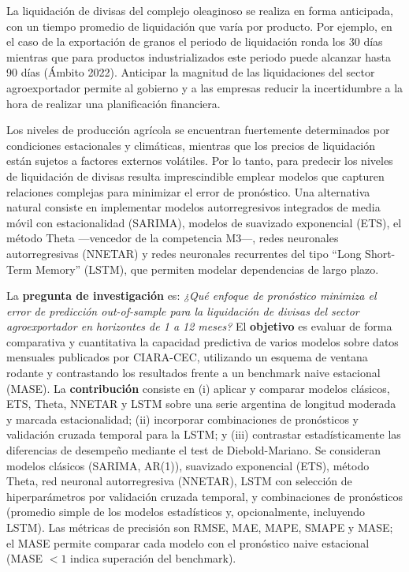\documentclass[
  12pt, a4paper, oneside]{article}
\begin{document}
La liquidación de divisas del complejo oleaginoso se realiza en forma anticipada, con un tiempo promedio de liquidación que varía por producto. Por ejemplo, en el caso de la exportación de granos el periodo de liquidación ronda los 30 días mientras que para productos industrializados este periodo puede alcanzar hasta 90 días (Ámbito 2022). Anticipar la magnitud de las liquidaciones del sector agroexportador permite al gobierno y a las empresas reducir la incertidumbre a la hora de realizar una planificación financiera.

Los niveles de producción agrícola se encuentran fuertemente determinados por condiciones estacionales y climáticas, mientras que los precios de liquidación están sujetos a factores externos volátiles. Por lo tanto, para predecir los niveles de liquidación de divisas resulta imprescindible emplear modelos que capturen relaciones complejas para minimizar el error de pronóstico. Una alternativa natural consiste en implementar modelos autorregresivos integrados de media móvil con estacionalidad (SARIMA), modelos de suavizado exponencial (ETS), el método Theta ---vencedor de la competencia M3---, redes neuronales autorregresivas (NNETAR) y redes neuronales recurrentes del tipo ``Long Short-Term Memory'' (LSTM), que permiten modelar dependencias de largo plazo.

La \textbf{pregunta de investigación} es: \emph{¿Qué enfoque de pronóstico minimiza el error de predicción out-of-sample para la liquidación de divisas del sector agroexportador en horizontes de 1 a 12 meses?} El \textbf{objetivo} es evaluar de forma comparativa y cuantitativa la capacidad predictiva de varios modelos sobre datos mensuales publicados por CIARA-CEC, utilizando un esquema de ventana rodante y contrastando los resultados frente a un benchmark naive estacional (MASE). La \textbf{contribución} consiste en (i) aplicar y comparar modelos clásicos, ETS, Theta, NNETAR y LSTM sobre una serie argentina de longitud moderada y marcada estacionalidad; (ii) incorporar combinaciones de pronósticos y validación cruzada temporal para la LSTM; y (iii) contrastar estadísticamente las diferencias de desempeño mediante el test de Diebold-Mariano. Se consideran modelos clásicos (SARIMA, AR(1)), suavizado exponencial (ETS), método Theta, red neuronal autorregresiva (NNETAR), LSTM con selección de hiperparámetros por validación cruzada temporal, y combinaciones de pronósticos (promedio simple de los modelos estadísticos y, opcionalmente, incluyendo LSTM). Las métricas de precisión son RMSE, MAE, MAPE, SMAPE y MASE; el MASE permite comparar cada modelo con el pronóstico naive estacional (MASE \(< 1\) indica superación del benchmark).
\end{document}
